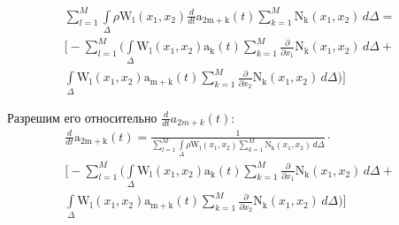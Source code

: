 \documentclass[14pt]{extreport}
\begin{document}
\begin{multline*}
\sum_{l=1}^{M} \int\limits_{\Delta} \rho \operatorname{W_{l}}{ (x_{1},x_{2}  )} \frac{d}{d t} \operatorname{a_{2m+k}}{ (t  )} \sum_{k=1}^{M} \operatorname{N_{k}}{ (x_{1},x_{2}  )}\, d\Delta = \\ \bigg [ - \sum_{l=1}^{M} \bigg(\int\limits_{\Delta} \operatorname{W_{l}}{ (x_{1},x_{2}  )} \operatorname{a_{k}}{ (t  )} \sum_{k=1}^{M} \frac{\partial}{\partial x_{1}} \operatorname{N_{k}}{ (x_{1},x_{2}  )}\, d\Delta + \\ \int\limits_{\Delta} \operatorname{W_{l}}{ (x_{1},x_{2}  )} \operatorname{a_{m+k}}{ (t  )} \sum_{k=1}^{M} \frac{\partial}{\partial x_{2}} \operatorname{N_{k}}{ (x_{1},x_{2}  )}\, d\Delta\bigg)\bigg ]
\end{multline*}

Разрешим его относительно $\frac{d}{dt}a_{2m+k}(t)$:
\begin{multline*}
\frac{d}{d t} \operatorname{a_{2m+k}}{ (t  )}= \frac{1}{\sum\limits_{l=1}^{M} \int\limits_{\Delta} \rho \operatorname{W_{l}}{ (x_{1},x_{2}  )}  \sum\limits_{k=1}^{M} \operatorname{N_{k}}{ (x_{1},x_{2}  )}\, d\Delta} \cdot \\ \bigg [ - \sum_{l=1}^{M} \bigg(\int\limits_{\Delta} \operatorname{W_{l}}{ (x_{1},x_{2}  )} \operatorname{a_{k}}{ (t  )} \sum\limits_{k=1}^{M} \frac{\partial}{\partial x_{1}} \operatorname{N_{k}}{ (x_{1},x_{2}  )}\, d\Delta + \\ \int\limits_{\Delta} \operatorname{W_{l}}{ (x_{1},x_{2}  )} \operatorname{a_{m+k}}{ (t  )} \sum_{k=1}^{M} \frac{\partial}{\partial x_{2}} \operatorname{N_{k}}{ (x_{1},x_{2}  )}\, d\Delta\bigg)\bigg ]
\end{multline*}
\end{document}
